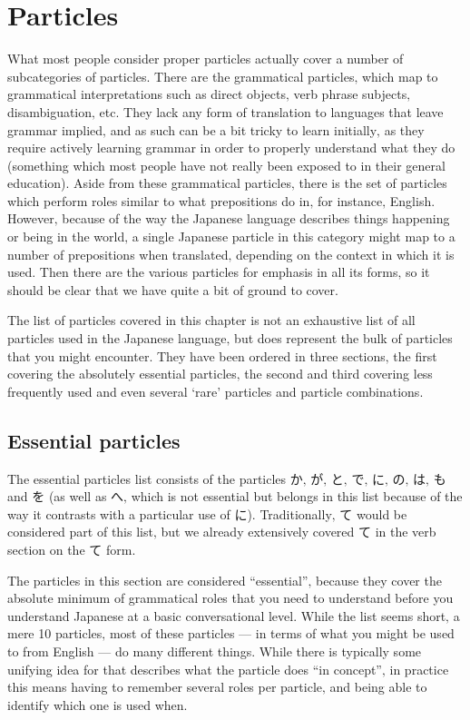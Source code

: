 \documentclass[11pt, b5paper, twoside, openright, onecolumn]{book}
\begin{document}
\section{Particles}

What most people consider proper particles actually cover a number of subcategories of particles. There are the grammatical particles‚ which map to grammatical interpretations such as direct objects‚ verb phrase subjects‚ disambiguation‚ etc. They lack any form of translation to languages that leave grammar implied‚ and as such can be a bit tricky to learn initially‚ as they require actively learning grammar in order to properly understand what they do (something which most people have not really been exposed to in their general education). Aside from these grammatical particles‚ there is the set of particles which perform roles similar to what prepositions do in‚ for instance‚ English. However‚ because of the way the Japanese language describes things happening or being in the world‚ a single Japanese particle in this category might map to a number of prepositions when translated‚ depending on the context in which it is used. Then there are the various particles for emphasis in all its forms‚ so it should be clear that we have quite a bit of ground to cover.

The list of particles covered in this chapter is not an exhaustive list of all particles used in the Japanese language‚ but does represent the bulk of particles that you might encounter. They have been ordered in three sections‚ the first covering the absolutely essential particles‚ the second and third covering less frequently used and even several ‘rare’ particles and particle combinations.

\subsection{Essential particles}

The essential particles list consists of the particles か‚ が‚ と‚ で‚ に‚ の‚ は‚ も and を (as well as へ‚ which is not essential but belongs in this list because of the way it contrasts with a particular use of に). Traditionally‚ て would be considered part of this list‚ but we already extensively covered て in the verb section on the て form. 

The particles in this section are considered “essential”‚ because they cover the absolute minimum of grammatical roles that you need to understand before you understand Japanese at a basic conversational level. While the list seems short‚ a mere 10 particles‚ most of these particles — in terms of what you might be used to from English — do many different things. While there is typically some unifying idea for that describes what the particle does “in concept”‚ in practice this means having to remember several roles per particle‚ and being able to identify which one is used when.
\end{document}
